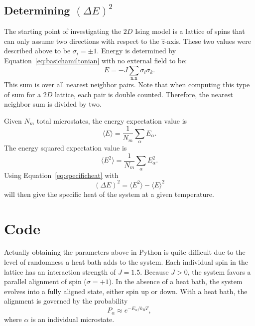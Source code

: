 \documentclass[12pt]{article}
\begin{document}
\subsection{Determining $\left(\Delta E\right)^2$}
\label{sec:determiningdE2}
The starting point of investigating the $2D$ Ising model is a lattice of spins that can only assume two directions with respect to the $\hat{z}$-axis. These two values were described above to be $\sigma_i=\pm 1$. Energy is determined by Equation~\ref{eq:basichamiltonian} with no external field to be:
\begin{equation}
  \label{eq:energy}
  E = - J \sum_{\text{n.n}} \sigma_i\sigma_k.
\end{equation}
This sum is over all nearest neighbor pairs. Note that when computing this type of sum for a $2D$ lattice, each pair is double counted. Therefore, the nearest neighbor sum is divided by two.

Given $N_m$ total microstates, the energy expectation value is
\begin{equation}
  \label{eq:energyexpect}
  \langle E \rangle = \frac{1}{N_m}\sum_\alpha E_\alpha.
\end{equation}
The energy squared expectation value is
\begin{equation}
  \label{eq:energy2expect}
  \langle E^2 \rangle = \frac{1}{N_m}\sum_\alpha E_\alpha^2.
\end{equation}
Using Equation~\ref{eq:specificheat} with
\begin{equation}
  \label{eq:dE2}
  \left(\Delta E\right)^2 = \langle E^2\rangle-\langle E \rangle^2
\end{equation}
will then give the specific heat of the system at a given temperature.

\section{Code}
\label{sec:code}
Actually obtaining the parameters above in Python is quite difficult due to the level of randomness a heat bath adds to the system. Each individual spin in the lattice has an interaction strength of $J=1.5$. Because $J>0$, the system favors a parallel alignment of spin ($\sigma = +1$). In the absence of a heat bath, the system evolves into a fully aligned state, either spin up or down. With a heat bath, the alignment is governed by the probability
\begin{equation}
  \label{eq:probabilityheatbath}
  P_\alpha \approx e^{-E_\alpha/k_BT},
\end{equation}
where $\alpha$ is an individual microstate.
\end{document}
